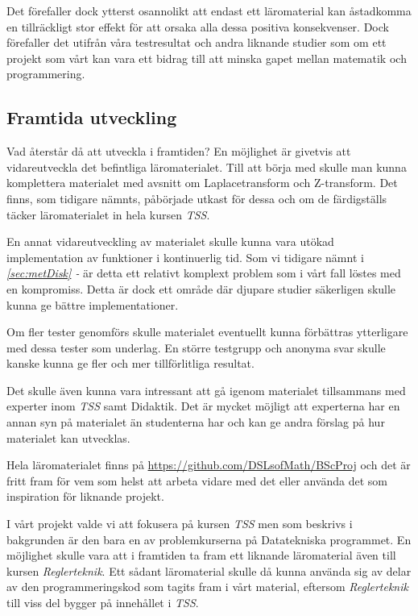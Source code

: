 \documentclass[12pt,a4paper,twoside,openright]{article}
\begin{document}
Det förefaller dock ytterst osannolikt att endast ett läromaterial kan
åstadkomma en tillräckligt stor effekt för att orsaka alla dessa
positiva konsekvenser. Dock förefaller det utifrån våra testresultat
och andra liknande studier som om ett projekt som vårt kan vara ett
bidrag till att minska gapet mellan matematik och programmering.

\subsection{Framtida utveckling}
Vad återstår då att utveckla i framtiden? En möjlighet är givetvis att
vidareutveckla det befintliga läromaterialet. Till att börja med
skulle man kunna komplettera materialet med avsnitt om
Laplacetransform och Z-transform. Det finns, som tidigare nämnts,
påbörjade utkast för dessa och om de färdigställs täcker
läromaterialet in hela kursen \textit{TSS}.

En annat vidareutveckling av materialet skulle kunna vara utökad
implementation av funktioner i kontinuerlig tid. Som vi tidigare nämnt
i \textit{\ref{sec:metDisk} - } är detta ett
relativt komplext problem som i vårt fall löstes med en
kompromiss. Detta är dock ett område där djupare studier säkerligen
skulle kunna ge bättre implementationer.

Om fler tester genomförs skulle materialet eventuellt kunna förbättras
ytterligare med dessa tester som underlag. En större testgrupp och
anonyma svar skulle kanske kunna ge fler och mer tillförlitliga
resultat.

Det skulle även kunna vara intressant att gå igenom materialet
tillsammans med experter inom \textit{TSS} samt Didaktik. Det är
mycket möjligt att experterna har en annan syn på materialet än
studenterna har och kan ge andra förslag på hur materialet kan
utvecklas.

Hela läromaterialet finns på
\url{https://github.com/DSLsofMath/BScProj} och det är fritt fram för
vem som helst att arbeta vidare med det eller använda det som
inspiration för liknande projekt.

I vårt projekt valde vi att fokusera på kursen \textit{TSS} men som
beskrivs i bakgrunden är den bara en av problemkurserna på
Datatekniska programmet. En möjlighet skulle vara att i framtiden ta
fram ett liknande läromaterial även till kursen
\textit{Reglerteknik}. Ett sådant läromaterial skulle då kunna använda
sig av delar av den programmeringskod som tagits fram i vårt material,
eftersom \textit{Reglerteknik} till viss del bygger på innehållet i
\textit{TSS}.
\end{document}
